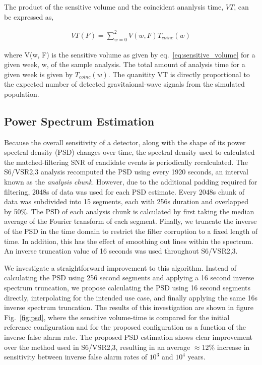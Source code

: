 The product of the sensitive volume and the coincident ananlysis time, $VT$, can be expressed as,

\begin{eqnarray}
VT (F) = \sum_{w=0}^2 V(w, F) T_{coinc}(w)
\end{eqnarray}

where V(w, F) is the sensitive volume as given by eq.~\ref{eq:sensitive_volume} for a given week, w, of the sample analysis. The total amount of analysis time for a given week is given by $T_{coinc}(w)$. The quanitity VT is directly proportional to the expected number of detected gravitaional-wave signals from the simulated population. 

\subsection{Power Spectrum Estimation}
\label{sec:psd}

Because the overall sensitivity of a detector, along with the shape of its power spectral density (PSD) changes over time, the spectral density used to calculated the matched-filtering SNR of candidate events is periodically recalculated. The S6/VSR2,3 analysis recomputed the PSD using every 1920 seconds, an interval known as the \emph{analysis chunk}. However, due to the additional padding required for filtering, 2048s of data was used for each PSD estimate. Every 2048s chunk of data was subdivided into 15 segments, each with 256s duration and overlapped by 50$\%$. The PSD of each analysis chunk is calculated by first taking the median average of the Fourier transform of each segment. Finally, we truncate the inverse of the PSD in the time domain to restrict the filter corruption to a fixed length of time. In addition, this has the effect of smoothing out lines within the spectrum. An inverse truncation value of 16 seconds was used throughout S6/VSR2,3. 

We investigate a straightforward improvement to this algorithm. Instead of calculating the PSD using 256 second segments and applying a 16 second inverse spectrum truncation, we propose calculating the PSD using 16 second segments directly, interpolating for the intended use case, and finally applying the same 16s inverse spectrum truncation. The results of this investigation are shown in figure Fig.~\ref{fig:psd}, where the sensitive volume-time is compared for the initial reference configuration and for the proposed configuration as a function of the inverse false alarm rate. The proposed PSD estimation shows clear improvement over the method used in S6/VSR2,3, resulting in an average $\approx 12\%$ increase in sensitivity between inverse false alarm rates of $10^3$ and $10^4$ years.

